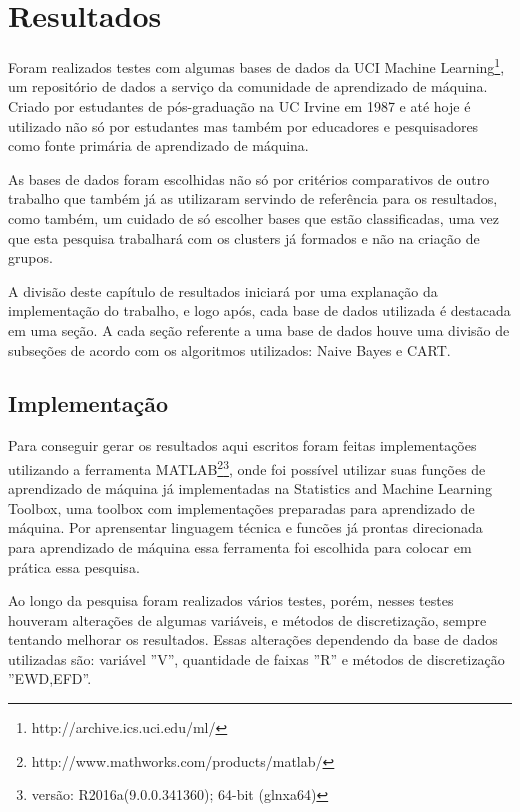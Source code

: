 \chapter{Resultados}\label{cap:resultados}

Foram realizados testes com algumas bases de dados da UCI Machine Learning\footnote{http://archive.ics.uci.edu/ml/}, um repositório de dados a serviço da comunidade de aprendizado de máquina. Criado por estudantes de pós-graduação na UC Irvine em 1987 e até hoje é utilizado não só por estudantes mas também por educadores e pesquisadores como fonte primária de aprendizado de máquina. 

As bases de dados foram escolhidas não só por critérios comparativos de outro trabalho que também já as utilizaram servindo  de referência para os resultados, como também, um cuidado de só escolher bases que estão classificadas, uma vez que esta pesquisa trabalhará com os clusters já formados e não na criação de grupos.

A divisão deste capítulo de resultados iniciará por uma explanação da implementação do trabalho, e logo após, cada base de dados utilizada é destacada em uma seção. A cada seção referente a uma base de dados houve uma divisão de subseções de acordo com os algoritmos utilizados: Naive Bayes e CART.

\section{Implementação}\label{cap:resultados:sec:implement}

Para conseguir gerar os resultados aqui escritos foram feitas implementações utilizando a ferramenta MATLAB\footnote{http://www.mathworks.com/products/matlab/}\footnote{versão: R2016a(9.0.0.341360); 64-bit (glnxa64)}, onde  foi possível utilizar suas funções de aprendizado de máquina já implementadas na Statistics and Machine Learning Toolbox, uma toolbox com implementações preparadas para aprendizado de máquina. Por aprensentar  linguagem técnica e funcões já prontas direcionada para aprendizado de máquina essa ferramenta foi escolhida para colocar em prática essa pesquisa.

Ao longo da pesquisa foram realizados vários testes, porém, nesses testes houveram alterações de algumas variáveis, e métodos de discretização, sempre tentando melhorar os resultados. Essas alterações dependendo da base de dados utilizadas são: variável ''V'', quantidade de faixas ''R'' e métodos de discretização ''EWD,EFD''. 

